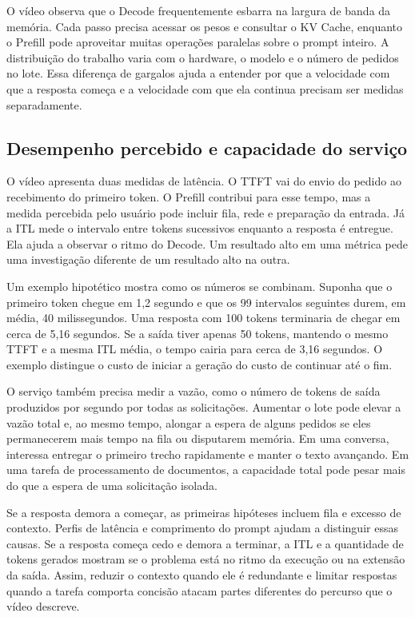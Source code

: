 \documentclass[12pt,a4paper]{article}
\begin{document}
O vídeo observa que o Decode frequentemente esbarra na largura de banda da memória. Cada passo precisa acessar os pesos e consultar o KV Cache, enquanto o Prefill pode aproveitar muitas operações paralelas sobre o prompt inteiro. A distribuição do trabalho varia com o hardware, o modelo e o número de pedidos no lote. Essa diferença de gargalos ajuda a entender por que a velocidade com que a resposta começa e a velocidade com que ela continua precisam ser medidas separadamente.

\subsection{Desempenho percebido e capacidade do serviço}

O vídeo apresenta duas medidas de latência. O TTFT vai do envio do pedido ao recebimento do primeiro token. O Prefill contribui para esse tempo, mas a medida percebida pelo usuário pode incluir fila, rede e preparação da entrada. Já a ITL mede o intervalo entre tokens sucessivos enquanto a resposta é entregue. Ela ajuda a observar o ritmo do Decode. Um resultado alto em uma métrica pede uma investigação diferente de um resultado alto na outra.

Um exemplo hipotético mostra como os números se combinam. Suponha que o primeiro token chegue em 1,2 segundo e que os 99 intervalos seguintes durem, em média, 40 milissegundos. Uma resposta com 100 tokens terminaria de chegar em cerca de 5,16 segundos. Se a saída tiver apenas 50 tokens, mantendo o mesmo TTFT e a mesma ITL média, o tempo cairia para cerca de 3,16 segundos. O exemplo distingue o custo de iniciar a geração do custo de continuar até o fim.

O serviço também precisa medir a vazão, como o número de tokens de saída produzidos por segundo por todas as solicitações. Aumentar o lote pode elevar a vazão total e, ao mesmo tempo, alongar a espera de alguns pedidos se eles permanecerem mais tempo na fila ou disputarem memória. Em uma conversa, interessa entregar o primeiro trecho rapidamente e manter o texto avançando. Em uma tarefa de processamento de documentos, a capacidade total pode pesar mais do que a espera de uma solicitação isolada.

Se a resposta demora a começar, as primeiras hipóteses incluem fila e excesso de contexto. Perfis de latência e comprimento do prompt ajudam a distinguir essas causas. Se a resposta começa cedo e demora a terminar, a ITL e a quantidade de tokens gerados mostram se o problema está no ritmo da execução ou na extensão da saída. Assim, reduzir o contexto quando ele é redundante e limitar respostas quando a tarefa comporta concisão atacam partes diferentes do percurso que o vídeo descreve.
\end{document}
